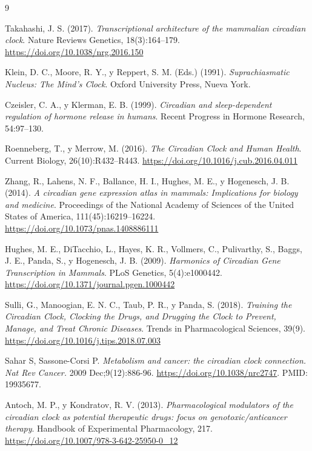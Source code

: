 \documentclass[12pt, a4paper]{report}
\begin{document}
\begin{thebibliography}{9}

Takahashi, J. S. (2017).
\textit{Transcriptional architecture of the mammalian circadian clock}.
Nature Reviews Genetics, 18(3):164--179. \url{https://doi.org/10.1038/nrg.2016.150}

Klein, D. C., Moore, R. Y., y Reppert, S. M. (Eds.) (1991).
\textit{Suprachiasmatic Nucleus: The Mind's Clock}.
Oxford University Press, Nueva York.

Czeisler, C. A., y Klerman, E. B. (1999).
\textit{Circadian and sleep-dependent regulation of hormone release in humans}.
Recent Progress in Hormone Research, 54:97--130.

Roenneberg, T., y Merrow, M. (2016).
\textit{The Circadian Clock and Human Health}.
Current Biology, 26(10):R432--R443. \url{https://doi.org/10.1016/j.cub.2016.04.011}

Zhang, R., Lahens, N. F., Ballance, H. I., Hughes, M. E., y Hogenesch, J. B. (2014).
\textit{A circadian gene expression atlas in mammals: Implications for biology and medicine}.
Proceedings of the National Academy of Sciences of the United States of America, 111(45):16219--16224. \url{https://doi.org/10.1073/pnas.1408886111}

Hughes, M. E., DiTacchio, L., Hayes, K. R., Vollmers, C., Pulivarthy, S., Baggs, J. E., Panda, S., y Hogenesch, J. B. (2009).
\textit{Harmonics of Circadian Gene Transcription in Mammals}.
PLoS Genetics, 5(4):e1000442. \url{https://doi.org/10.1371/journal.pgen.1000442}

Sulli, G., Manoogian, E. N. C., Taub, P. R., y Panda, S. (2018).
\textit{Training the Circadian Clock, Clocking the Drugs, and Drugging the Clock to Prevent, Manage, and Treat Chronic Diseases}.
Trends in Pharmacological Sciences, 39(9). \url{https://doi.org/10.1016/j.tips.2018.07.003}

Sahar S, Sassone-Corsi P. \textit{Metabolism and cancer: the circadian clock connection. Nat Rev Cancer.} 2009 Dec;9(12):886-96. \url{https://doi.org/10.1038/nrc2747}. PMID: 19935677.

Antoch, M. P., y Kondratov, R. V. (2013).
\textit{Pharmacological modulators of the circadian clock as potential therapeutic drugs: focus on genotoxic/anticancer therapy}.
Handbook of Experimental Pharmacology, 217. \url{https://doi.org/10.1007/978-3-642-25950-0_12}


\end{thebibliography}
\end{document}
